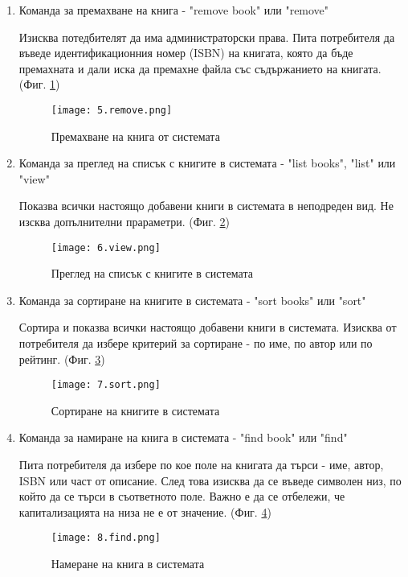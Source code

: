 \begin{enumerate}
    \item Команда за премахване на книга - "remove book" или "remove"
    
    Изисква потедбителят да има администраторски права. Пита потребителя да въведе идентификационния номер (ISBN) на книгата, която да бъде премахната и дали иска да премахне файла със съдържанието на книгата. (Фиг. \ref{fig:remove})
    \begin{figure}[H]
        \texttt{[image: 5.remove.png]}
        \centering
        \caption{Премахване на книга от системата}
        \label{fig:remove}
    \end{figure}
    

    \item Команда за преглед на списък с книгите в системата - "list books", "list" или "view"
    
    Показва всички настоящо добавени книги в системата в неподреден вид. Не изсква допълнителни прараметри. (Фиг. \ref{fig:view})
    \begin{figure}[H]
        \texttt{[image: 6.view.png]}
        \centering
        \caption{Преглед на списък с книгите в системата}
        \label{fig:view}
    \end{figure}

    \item Команда за сортиране на книгите в системата - "sort books" или "sort"

    Сортира и показва всички настоящо добавени книги в системата. Изисква от потребителя да избере критерий за сортиране - по име, по автор или по рейтинг. (Фиг. \ref{fig:sort})
    \begin{figure}[H]
        \texttt{[image: 7.sort.png]}
        \centering
        \caption{Сортиране на книгите в системата}
        \label{fig:sort}
    \end{figure}

    \item Команда за намиране на книга в системата - "find book" или "find"

    Пита потребителя да избере по кое поле на книгата да търси - име, автор, ISBN или част от описание. След това изисква да се въведе символен низ, по който да се търси в съответното поле. Важно е да се отбележи, че капитализацията на низа не е от значение. (Фиг. \ref{fig:find})

    \begin{figure}[H]
        \texttt{[image: 8.find.png]}
        \centering
        \caption{Намеране на книга в системата}
        \label{fig:find}
    \end{figure}


\end{enumerate}
